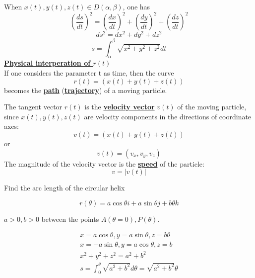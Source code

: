 \documentclass[11pt]{amsbook}
\begin{document}


When $x(t), y(t), z(t) \in D(\alpha, \beta)$, one has
\begin{equation}
(\frac{ds}{dt})^2 = (\frac{dx}{dt})^2 + (\frac{dy}{dt})^2 + (\frac{dz}{dt})^2
\end{equation}
\begin{equation}
ds^2 = dx^2 + dy^2 + dz^2
\end{equation}
\begin{equation}
s = \int_{\alpha}^{\beta} \sqrt{x^2 + y^2 + z^2} dt
\end{equation}
\textbf{\underline{Physical interperation of $r(t)$}} \\
If one considers the parameter t as time, then the curve
\begin{equation}
r(t) =( x(t) +y(t) + z(t))
\end{equation}
becomes the \textbf{\underline{path}} (\textbf{\underline{trajectory}}) of a moving particle. \par The tangent vector $r(t)$ is the \textbf{\underline{velocity vector}} $v(t)$ of the moving particle, since $x(t), y(t), z(t)$ are velocity components in the directions of coordinate axes:
\begin{equation}
v(t) = ( x(t) +y(t) + z(t))
\end{equation}
or
\begin{equation}
v(t) = ( v_x, v_y, v_z)
\end{equation}
The magnitude of the velocity vector is the \textbf{\underline{speed}} of the particle:
\begin{equation}
v = \lvert v(t) \rvert 
\end{equation}
\begin{exmp}{Find the arc length of the circular helix }

\begin{equation}
r(\theta) = a\cos{\theta} i + a\sin{\theta} j + b \theta k
\end{equation}


$a>0, b>0$ between the points $A(\theta = 0), P(\theta)$.
\end{exmp}
\begin{hSolution}
\begin{align*}
x = a \cos{\theta} , y = a \sin{\theta}, z = b\theta\\
x = -a \sin{\theta} , y = a \cos{\theta}, z = b\\
x^2 + y^2 + z^2 = a^2 + b^2\\
s = \int_{0}^{\theta} \sqrt{a^2 + b^2} d\theta = \sqrt{a^2 + b^2} \theta\\
\end{align*}
\end{hSolution}
\end{document}
